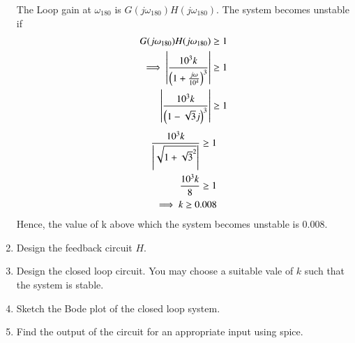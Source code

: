 \begin{enumerate}[label=\arabic*.,ref=\theenumi]
The Loop gain at $\omega_{180}$ is $G(j\omega_{180})H(j\omega_{180})$.
 The system becomes unstable if 
\begin{align}
G(j\omega_{180})H(j\omega_{180})\geq 1 \\
\implies \left\vert\frac{10^3k}{\left(1+\frac{j\omega}{10^4}\right)^3}\right\vert \geq 1\\
\left\vert\frac{10^3k}{\left(1-\sqrt{3}j\right)^3} \right\vert \geq 1
\end{align}
\begin{align}
     \frac{10^3k}{\left\vert\sqrt{1+{\sqrt{3}}^2}\right\vert} \geq 1\\
     \frac{10^3k}{8} \geq 1 \\
     \implies k \geq 0.008
\end{align}
Hence, the value of k above which the system becomes unstable is 0.008. 
\item Design the feedback circuit $H$.
\item Design the closed loop circuit.  You may choose a suitable vale of $k$ such that the system is stable.
\item Sketch the Bode plot of the closed loop system.
\item Find the output of the circuit for an appropriate input using spice.

\end{enumerate}
